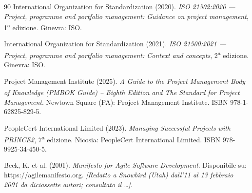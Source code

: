 \begin{thebibliography}{90}
 International Organization for Standardization (2020).
  \emph{ISO 21502:2020 --- Project, programme and portfolio management: Guidance
  on project management}, 1\textsuperscript{a} edizione. Ginevra: ISO.

 International Organization for Standardization (2021).
  \emph{ISO 21500:2021 --- Project, programme and portfolio management: Context
  and concepts}, 2\textsuperscript{a} edizione. Ginevra: ISO.


 Project Management Institute (2025). \emph{A Guide to the
  Project Management Body of Knowledge (PMBOK\textsuperscript{\textregistered}
  Guide) -- Eighth Edition and The Standard for Project Management}. Newtown
  Square (PA): Project Management Institute. ISBN 978-1-62825-829-5.


 PeopleCert International Limited (2023). \emph{Managing
  Successful Projects with PRINCE2}, 7\textsuperscript{a} edizione. Nicosia:
  PeopleCert International Limited. ISBN 978-9925-34-450-5.



 Beck, K. et al. (2001). \emph{Manifesto for Agile
  Software Development}. Disponibile su: https://agilemanifesto.org.
  \emph{[Redatto a Snowbird (Utah) dall'11 al 13 febbraio 2001 da diciassette
  autori; consultato il \ldots]}.



\end{thebibliography}

